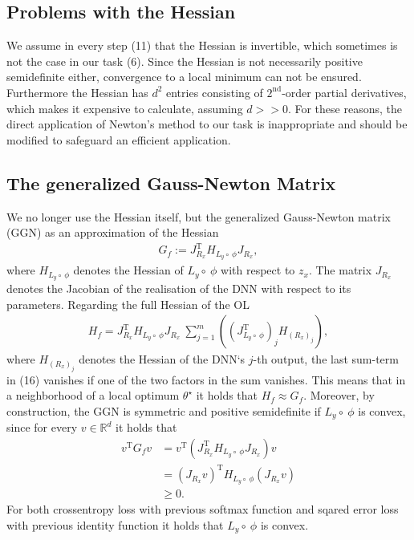 \documentclass[conference]{IEEEtran}
\begin{document}
	
	\subsection{Problems with the Hessian}
	\noindent
	We assume in every step (11) that the Hessian is invertible, which sometimes is not the case in our task (6). Since the Hessian is not necessarily positive semidefinite either, convergence to a local minimum can not be ensured. Furthermore the Hessian has $d^{2}$ entries consisting of $2^{\text{nd}}$-order partial derivatives, which makes it expensive to calculate, assuming $d>>0$. For these reasons, the direct application of Newton's method to our task is inappropriate and should be modified to safeguard an efficient application.
	
	\subsection{The generalized Gauss-Newton Matrix}
	\noindent
	We no longer use the Hessian itself, but the generalized Gauss-Newton matrix (GGN) as an approximation of the Hessian
	\begin{align}
	G_{f} := J_{R_{x}}^{\mathrm{T}}H_{L_{y}\circ\:\phi}J_{R_{x}},
	\end{align}
	where $H_{L_{y}\circ\:\phi}$ denotes the Hessian of $L_{y}\circ\:\phi$ with respect to $z_{x}$. The matrix $J_{R_{x}}$ denotes the Jacobian of the realisation of the DNN with respect to its parameters.
	Regarding the full Hessian of the OL
	\begin{align}
	H_{f} = J_{R_{x}}^{\mathrm{T}}H_{L_{y}\circ\:\phi}J_{R_{x}}\:\sum_{j = 1}^{m}\left(\left(J_{L_{y}\circ \:\phi}^{\mathrm{T}}\right)_{j} H_{(R_{x})_{j}}\right),
	\end{align}
	where $H_{(R_{x})_{j}}$ denotes the Hessian of the DNN`s  $j$-th output, the last sum-term in (16) vanishes if one of the two factors in the sum vanishes.
	This means that in a neighborhood of a local optimum $\theta^{\star}$ it holds that $H_{f} \approx G_{f}$.   Moreover, by construction, the GGN is symmetric and positive semidefinite if $L_{y}\circ\:\phi$ is convex, since for every $v\in\mathbb{R}^{d}$ it holds that
	\begin{align}
	v^{\mathrm{T}}G_{f}v &= v^{\mathrm{T}}\left( J_{R_{x}}^{\mathrm{T}}H_{L_{y}\circ\:\phi}J_{R_{x}}\right)v\\
	&= \left(J_{R_{x}}v\right)^{\mathrm{T}}H_{L_{y}\circ\:\phi}\left(J_{R_{x}}v\right) \\
	&\geq 0.
	\end{align}
	For both crossentropy loss with previous softmax function and sqared error loss with previous identity function it holds that $L_{y}\circ\:\phi$ is convex.
	
\end{document}
